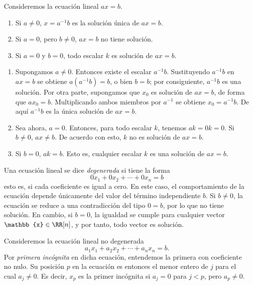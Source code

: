 \begin{theorem}{}{}
    Consideremos la ecuación lineal $ax = b$.
    \begin{enumerate}[label=\roman*), topsep=6pt, itemsep=0pt]
        \item Si $a \neq 0$, $x = a^{-1}b$ es la solución única de $ax = b$.
        \item Si $a = 0$, pero $b \neq 0$, $ax = b$ no tiene solución.
        \item Si $a = 0$ y $b = 0$, todo escalar $k$ es solución de $ax = b$.
    \end{enumerate}

    \tcblower
    \demostracion
    \begin{enumerate}[label=\roman*), topsep=6pt, itemsep=0pt]
        \item Supongamos $a \neq 0$. Entonces existe el escalar $a^{-1}b$. Sustituyendo $a^{-1}b$ en $ax = b$ se obtiene $a(a^{-1}b) = b$, o bien $b = b$; por consiguiente, $a^{-1}b$ es una solución. Por otra parte, supongamos que $x_0$ es solución de $ax = b$, de forma que $ax_0 = b$. Multiplicando ambos miembros por $a^{-1}$ se obtiene $x_0 = a^{-1}b$. De aquí $a^{-1}b$ es la única solución de $ax = b$.
        \newpage
        \item Sea ahora, $a = 0$. Entonces, para todo escalar $k$, tenemos $ak = 0k = 0$. Si $b \neq 0$, $ax \neq b$. De acuerdo con esto, $k$ no es solución de $ax = b$.
        \item Si $b = 0$, $ak = b$. Esto es, cualquier escalar $k$ es una solución de $ax = b$.
    \end{enumerate}
\end{theorem}

Una ecuación lineal se dice \textit{degenerada} si tiene la forma
$$0x_1 + 0x_2 + \cdots + 0x_n = b$$
esto es, si cada coeficiente es igual a cero. En este caso, el comportamiento de la ecuación depende únicamente del valor del término independiente $b$. Si $b \neq 0$, la ecuación se reduce a una contradicción del tipo $0 = b$, por lo que no tiene solución. En cambio, si $b = 0$, la igualdad se cumple para cualquier vector $\mathbb{x} \in \RR[n]$, y por tanto, todo vector es solución.

\begin{definicion}{}{}
    Consideremos la ecuación lineal no degenerada
    $$a_1x_1 + a_2x_2 + \cdots + a_nx_n = b.$$
    Por \emph{primera incógnita} en dicha ecuación, entendemos la primera con coeficiente no nulo. Su posición $p$ en la ecuación es entonces el menor entero de $j$ para el cual $a_j \neq 0$. Es decir, $x_p$ es la primer incógnita si $a_j = 0$ para $j < p$, pero $a_p \neq 0$.
\end{definicion}

